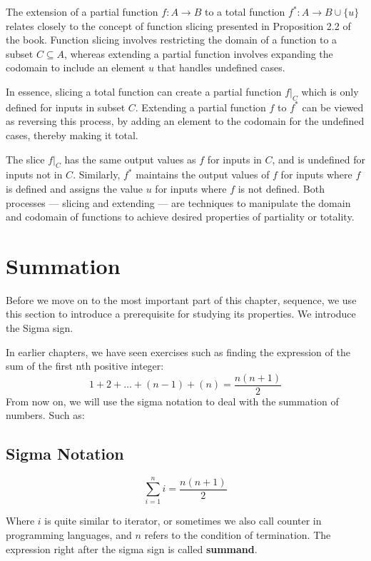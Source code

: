 			\begin{remark}
				The extension of a partial function \( f: A \rightarrow B \) to a total function \( f^*: A \rightarrow B \cup \{u\} \) relates closely to the concept of function slicing presented in Proposition 2.2 of the book. Function slicing involves restricting the domain of a function to a subset \( C \subseteq A \), whereas extending a partial function involves expanding the codomain to include an element \( u \) that handles undefined cases.
				
				In essence, slicing a total function can create a partial function \( f|_C \) which is only defined for inputs in subset \( C \). Extending a partial function \( f \) to \( f^* \) can be viewed as reversing this process, by adding an element to the codomain for the undefined cases, thereby making it total. 
				
				The slice \( f|_C \) has the same output values as \( f \) for inputs in \( C \), and is undefined for inputs not in \( C \). Similarly, \( f^* \) maintains the output values of \( f \) for inputs where \( f \) is defined and assigns the value \( u \) for inputs where \( f \) is not defined. Both processes — slicing and extending — are techniques to manipulate the domain and codomain of functions to achieve desired properties of partiality or totality.
			\end{remark}			
\section{Summation}
Before we move on to the most important part of this chapter, sequence, we use this section to introduce a prerequisite for studying its properties. We introduce the Sigma sign.

In earlier chapters, we have seen exercises such as finding the expression of the sum of the first nth positive integer:
$$1 + 2 + \dots + (n-1) + (n)= \frac{n(n+1)}{2}$$ 
From now on, we will use the sigma notation to deal with the summation of numbers. Such as:
\subsection{Sigma Notation}
\begin{notation}
    \[
\sum_{i=1}^{n} i = \frac{n(n + 1)}{2}
    \]
\end{notation}
Where $i$ is quite similar to iterator, or sometimes we also call counter in programming languages, and $n$ refers to the condition of termination. The expression right after the sigma sign is called \textbf{summand}.

